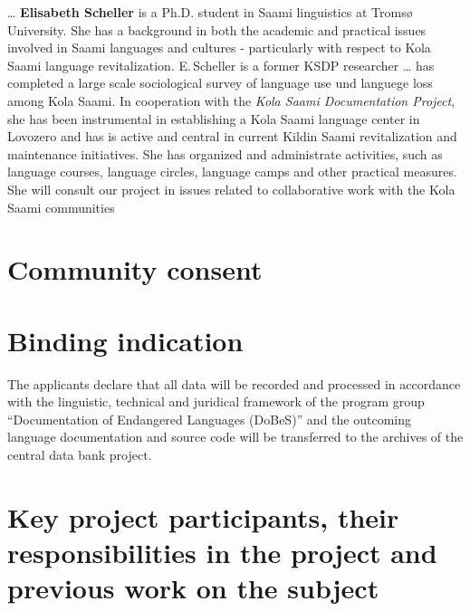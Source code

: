 \documentclass[a4paper,12pt]{article}
\begin{document}
{{{{… {\bf Elisabeth Scheller} is a Ph.D. student in Saami linguistics at Tromsø University. She has a background in both the academic and practical issues involved in Saami languages and cultures - particularly with respect to Kola Saami language revitalization. E.\,Scheller is a former KSDP researcher … has completed a large scale sociological survey of language use und languege loss among Kola Saami. In cooperation with the {\it Kola Saami Documentation Project}, she has been instrumental in establishing a Kola Saami language center in Lovozero and has is active and central in current Kildin Saami revitalization and maintenance initiatives. She has organized and administrate activities, such as language courses, language circles, language camps and other practical measures. She will consult our project in issues related to collaborative work with the Kola Saami communities
 



\section{Community consent}

\section{Binding indication}

The applicants declare that all data will be recorded and processed in accordance with the linguistic, technical and juridical framework of the program group “Documentation of Endangered Languages (DoBeS)” and the outcoming language documentation and source code will be transferred to the archives of the central data bank project.

\section{Key project participants, their responsibilities in the project and previous work on the subject}

}}}}
\end{document}
